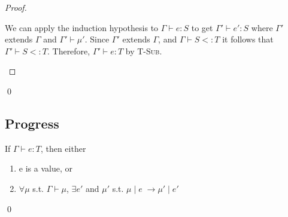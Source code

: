 \documentclass{llncs}
\begin{document}
\begin{proof}
\begin{case}
\end{case}
\begin{case}
We can apply the induction hypothesis to $\Gamma \vdash e : S$ 
to get $\Gamma' \vdash e' : S$ where $\Gamma'$ extends $\Gamma$ 
and $\Gamma' \vdash \mu'$. Since $\Gamma'$ extends $\Gamma$, 
and $\Gamma \vdash S <: T$ it follows that 
$\Gamma' \vdash S <: T$. Therefore, $\Gamma' \vdash e : T$ by \textsc{T-Sub}.
\end{case}
\end{proof}
\qed


%

\subsection{Progress}
\begin{theorem}[Progress]
If $\Gamma \vdash e : T$, then either
\begin{enumerate}
\item e is a value, or
\item $\forall \mu$ s.t.
		   $\Gamma \vdash \mu$,
         $\exists e'$ and $\mu'$ s.t. 
         $\mu \; | \; e \; \rightarrow \mu' \; | \; e'$
\end{enumerate}
\end{theorem}
\qed 








\end{document}
